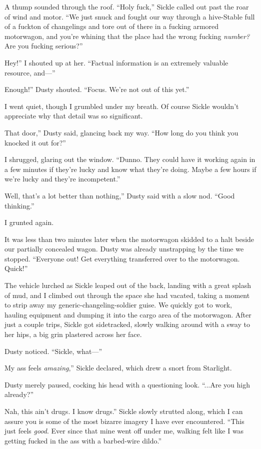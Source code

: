 A thump sounded through the roof. “Holy fuck,” Sickle called out past the roar of wind and motor. “We just snuck and fought our way through a hive-Stable full of a fuckton of changelings and tore out of there in a fucking armored motorwagon, and you’re whining that the place had the wrong fucking \textit{number?} Are you fucking serious?”

\leavevmode{}Hey!” I shouted up at her. “Factual information is an extremely valuable resource, and—”

\leavevmode{}Enough!” Dusty shouted. “Focus. We’re not out of this yet.”

I went quiet, though I grumbled under my breath. Of course Sickle wouldn’t appreciate why that detail was so significant.

\leavevmode{}That door,” Dusty said, glancing back my way. “How long do you think you knocked it out for?”

I shrugged, glaring out the window. “Dunno. They could have it working again in a few minutes if they’re lucky and know what they’re doing. Maybe a few hours if we’re lucky and they’re incompetent.”

\leavevmode{}Well, that’s a lot better than nothing,” Dusty said with a slow nod. “Good thinking.”

I grunted again.

It was less than two minutes later when the motorwagon skidded to a halt beside our partially concealed wagon. Dusty was already unstrapping by the time we stopped. “Everyone out! Get everything transferred over to the motorwagon. Quick!”

The vehicle lurched as Sickle leaped out of the back, landing with a great splash of mud, and I climbed out through the space she had vacated, taking a moment to strip away my generic-changeling-soldier guise. We quickly got to work, hauling equipment and dumping it into the cargo area of the motorwagon. After just a couple trips, Sickle got sidetracked, slowly walking around with a sway to her hips, a big grin plastered across her face.

Dusty noticed. “Sickle, what—”

\leavevmode{}My ass feels \textit{amazing},” Sickle declared, which drew a snort from Starlight.

Dusty merely paused, cocking his head with a questioning look. “...Are you high already?”

\leavevmode{}Nah, this ain’t drugs. I know drugs.” Sickle slowly strutted along, which I can assure you is some of the most bizarre imagery I have ever encountered. “This just feels \textit{good}. Ever since that mine went off under me, walking felt like I was getting fucked in the ass with a barbed-wire dildo.”

